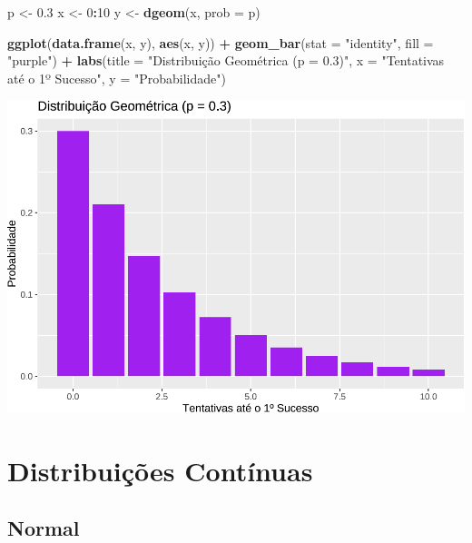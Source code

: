 \documentclass[
]{book}
\newenvironment{Shaded}{\begin{snugshade}}{\end{snugshade}}
\newcommand{\AttributeTok}[1]{\textcolor[rgb]{0.13,0.29,0.53}{#1}}
\newcommand{\DecValTok}[1]{\textcolor[rgb]{0.00,0.00,0.81}{#1}}
\newcommand{\FloatTok}[1]{\textcolor[rgb]{0.00,0.00,0.81}{#1}}
\newcommand{\FunctionTok}[1]{\textcolor[rgb]{0.13,0.29,0.53}{\textbf{#1}}}
\newcommand{\NormalTok}[1]{#1}
\newcommand{\OtherTok}[1]{\textcolor[rgb]{0.56,0.35,0.01}{#1}}
\newcommand{\SpecialCharTok}[1]{\textcolor[rgb]{0.81,0.36,0.00}{\textbf{#1}}}
\newcommand{\StringTok}[1]{\textcolor[rgb]{0.31,0.60,0.02}{#1}}
\begin{document}
\begin{Shaded}
\begin{Highlighting}[]
\NormalTok{p }\OtherTok{\textless{}{-}} \FloatTok{0.3}
\NormalTok{x }\OtherTok{\textless{}{-}} \DecValTok{0}\SpecialCharTok{:}\DecValTok{10}
\NormalTok{y }\OtherTok{\textless{}{-}} \FunctionTok{dgeom}\NormalTok{(x, }\AttributeTok{prob =}\NormalTok{ p)}

\FunctionTok{ggplot}\NormalTok{(}\FunctionTok{data.frame}\NormalTok{(x, y), }\FunctionTok{aes}\NormalTok{(x, y)) }\SpecialCharTok{+}
  \FunctionTok{geom\_bar}\NormalTok{(}\AttributeTok{stat =} \StringTok{"identity"}\NormalTok{, }\AttributeTok{fill =} \StringTok{"purple"}\NormalTok{) }\SpecialCharTok{+}
  \FunctionTok{labs}\NormalTok{(}\AttributeTok{title =} \StringTok{"Distribuição Geométrica (p = 0.3)"}\NormalTok{, }\AttributeTok{x =} \StringTok{"Tentativas até o 1º Sucesso"}\NormalTok{, }\AttributeTok{y =} \StringTok{"Probabilidade"}\NormalTok{)}
\end{Highlighting}
\end{Shaded}

\includegraphics{Livro-Estatistica+R_files/figure-latex/geometrica-1.pdf}

\section{Distribuições Contínuas}\label{distribuiuxe7uxf5es-contuxednuas}

\subsection{Normal}\label{normal}
\end{document}
